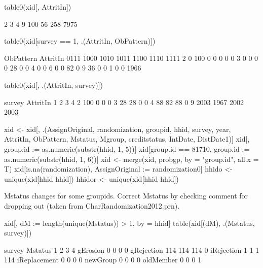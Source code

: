 \begin{Schunk}
\begin{Sinput}
table0(xid[, AttritIn])
\end{Sinput}
\begin{Soutput}

   2    3    4    9 
 100   56  258 7975 
\end{Soutput}
\begin{Sinput}
table0(xid[survey == 1, .(AttritIn, ObPattern)])
\end{Sinput}
\begin{Soutput}
        ObPattern
AttritIn 0111 1000 1010 1011 1100 1110 1111
       2    0  100    0    0    0    0    0
       3    0    0    0    0   28    0    0
       4    0    0    6    0    0   82    0
       9   36    0    0    1    0    0 1966
\end{Soutput}
\begin{Sinput}
table0(xid[, .(AttritIn, survey)])
\end{Sinput}
\begin{Soutput}
        survey
AttritIn    1    2    3    4
       2  100    0    0    0
       3   28   28    0    0
       4   88   82   88    0
       9 2003 1967 2002 2003
\end{Soutput}
\begin{Sinput}
xid <- xid[, .(AssignOriginal, randomization, groupid, hhid, 
  survey, year, AttritIn, ObPattern, Mstatus, Mgroup, 
  creditstatus, IntDate, DistDate1)]
xid[, group.id := as.numeric(substr(hhid, 1, 5))]
xid[group.id == 81710, group.id := as.numeric(substr(hhid, 1, 6))]
xid <- merge(xid, probgp, by = "group.id", all.x = T)
xid[is.na(randomization), AssignOriginal := randomization0]
hhido <- unique(xid[hhid %in% hhid[!grepl("new|Rep", Mstatus) & survey == 1], 
   hhid])
hhidor <- unique(xid[hhid %in% hhid[!grepl("new", Mstatus) & survey == 1], 
   hhid])
\end{Sinput}
\end{Schunk}
\textsf{Mstatus} changes for some \textsf{groupid}s. Correct \textsf{Mstatus} by checking \textsf{comment} for dropping out (taken from CharRandomization2012.prn).
\begin{Schunk}
\begin{Sinput}
xid[, dM := length(unique(Mstatus)) > 1, by = hhid]
table(xid[(dM), .(Mstatus, survey)])
\end{Sinput}
\begin{Soutput}
              survey
Mstatus          1   2   3   4
  gErosion       0   0   0   0
  gRejection   114 114 114   0
  iRejection     1   1   1 114
  iReplacement   0   0   0   0
  newGroup       0   0   0   0
  oldMember      0   0   0   1
\end{Soutput}
\end{Schunk}
